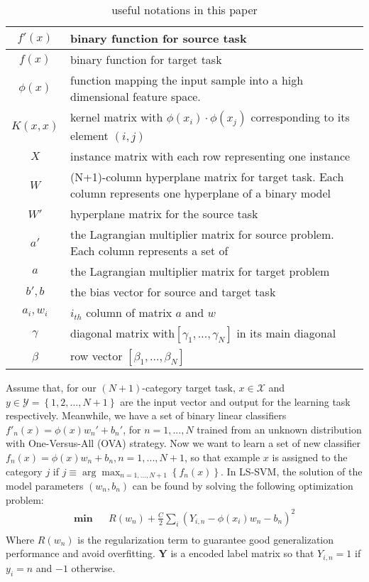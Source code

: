 \begin{table}[htbp]
  \centering
  \caption{useful notations in this paper}
    \begin{tabular}{|c|L{7cm}|}
    \hline
    $f'(x)$ & binary function for source task \\
    \hline
    $f(x)$  & binary function for target task \\
    \hline
    $\phi(x)$ &  function mapping the input sample into a high dimensional feature space. \\ \hline
    $K(x,x)$ & kernel matrix with  $\phi(x_i) \cdot\phi(x_j)$ corresponding to its element $(i,j)$\\ \hline
    $X$     & instance matrix with each row representing one instance \\\hline
    $W $    & (N+1)-column hyperplane matrix for target task. Each column represents one hyperplane of a binary model \\\hline
    $W'$    & hyperplane matrix for the source task \\\hline
    $a' $   & the Lagrangian multiplier matrix for source problem. Each column represents a set of  \\\hline
    $a $    & the Lagrangian multiplier matrix for target problem \\
    \hline
    $b',b$  & the bias vector for source and target task \\
        \hline
    $a_i,w_i$ & $i_{th}$ column of matrix $a$ and $w$\\\hline
    $\gamma$ &  diagonal matrix with$\left[ {{\gamma _1},...,{\gamma _N}} \right]$ in its main diagonal\\\hline
    $\beta$ & row vector $\left[ {{\beta _1},...,{\beta _N}} \right]$\\ \hline
    \end{tabular}%
  \label{tab:notation}%
\end{table}%

 

Assume that, for our $(N+1)$-category target task, ${x} \in \mathcal{X}$ and ${y} \in \mathcal{Y}=\left\{1,2,...,N+1\right\}$ are the input vector and output for the learning task respectively. Meanwhile, we have a set of binary linear classifiers $f'_n(x)=\phi(x)w_n'+b_n'$, for $n=1,...,N$ trained from an unknown distribution with One-Versus-All (OVA) strategy.  Now we want to learn a set of new classifier $f_n(x)=\phi(x)w_n+b_n, n=1,...,N+1$, so that example $x$ is assigned to the category $j$ if $j \equiv \arg {\max _{n = 1,...,N+1}}\left\{{f_n}(x)\right\}$. In LS-SVM, the solution of the model parameters $(w_n,b_n)$ can be found by solving the following optimization problem:
\begin{equation*}
\begin{aligned}
\textbf{min} && R({w_n}) + \frac{C}{2}\sum\limits_i {({Y_{i,n}} - \phi ({x_i}){w_n} - {b_n})^2} \\
\end{aligned}
\end{equation*}
Where $R({w_n})$ is the regularization term to guarantee good generalization performance and avoid overfitting. $\mathbf{Y}$ is a encoded label matrix so that $Y_{i,n}=1$ if $y_i=n$ and $-1$ otherwise.  


